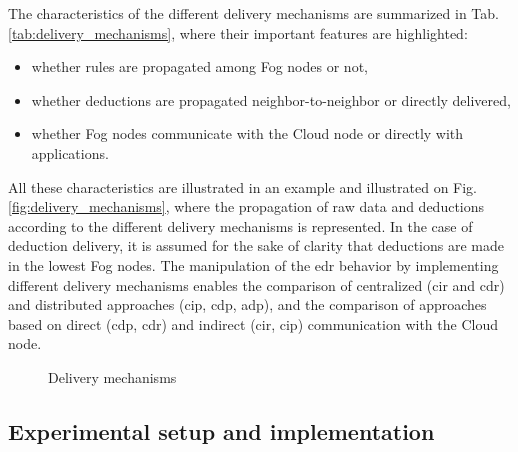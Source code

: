 \documentclass[sw]{iosart2x}
\begin{document}
The characteristics of the different delivery mechanisms are summarized in Tab. \ref{tab:delivery_mechanisms}, where their important features are highlighted: 
\begin{itemize}
	\item whether rules are propagated among Fog nodes or not,
	\item whether deductions are propagated neighbor-to-neighbor or directly delivered,
	\item whether Fog nodes communicate with the Cloud node or directly with applications. 
\end{itemize}  

	

All these characteristics are illustrated in an example and illustrated on Fig. \ref{fig:delivery_mechanisms}, where the propagation of raw data and deductions according to the different delivery mechanisms is represented. 
In the case of deduction delivery, it is assumed for the sake of clarity that deductions are made in the lowest Fog nodes. 
The manipulation of the \gls{edr} behavior by implementing different delivery mechanisms enables the comparison of centralized (\gls{cir} and \gls{cdr}) and distributed approaches (\gls{cip}, \gls{cdp}, \gls{adp}), and the comparison of approaches based on direct (\gls{cdp}, \gls{cdr}) and indirect (\gls{cir}, \gls{cip}) communication with the Cloud node. 

\begin{figure}
	\centering
	\caption{Delivery mechanisms}
	\scalebox{0.8}{
		
		\label{fig:delivery_mechanisms}	
	}
\end{figure}


\subsection{Experimental setup and implementation}
\label{sec:setup}
\end{document}
